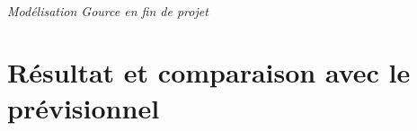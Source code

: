\paragraph{}
\noindent
{}
\begin{center}
\textit{Modélisation Gource en fin de projet}
\end{center}

\section{Résultat et comparaison avec le prévisionnel}

